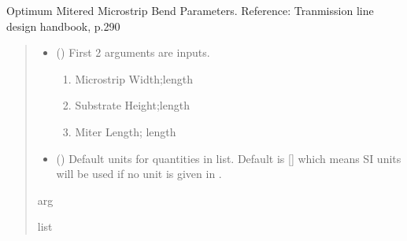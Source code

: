 \documentclass[letterpaper,10pt,english]{sphinxmanual}
\begin{document}

\begin{fulllineitems}
\label{\detokenize{components:components.OptimumMitered90DegMicrostripBend}}
\pysigstartsignatures
{}
\pysigstopsignatures
\sphinxAtStartPar
Optimum Mitered Microstrip Bend Parameters.
Reference: Tranmission line design handbook, p.290
\begin{quote}\begin{description}
\begin{itemize}
\item {} 
\sphinxAtStartPar
{} () \textendash{} 
\sphinxAtStartPar
First 2 arguments are inputs.
\begin{enumerate}
%
\item {} 
\sphinxAtStartPar
Microstrip Width;length

\item {} 
\sphinxAtStartPar
Substrate Height;length

\item {} 
\sphinxAtStartPar
Miter Length; length

\end{enumerate}


\item {} 
\sphinxAtStartPar
{} (\sphinxstyleliteralemphasis{\sphinxupquote{, }}) \textendash{} Default units for quantities in  list. Default is {[}{]} which means SI units will be used if no unit is given in .

\end{itemize}

\sphinxAtStartPar
arg

\sphinxAtStartPar
list

\end{description}\end{quote}

\end{fulllineitems}
\end{document}
